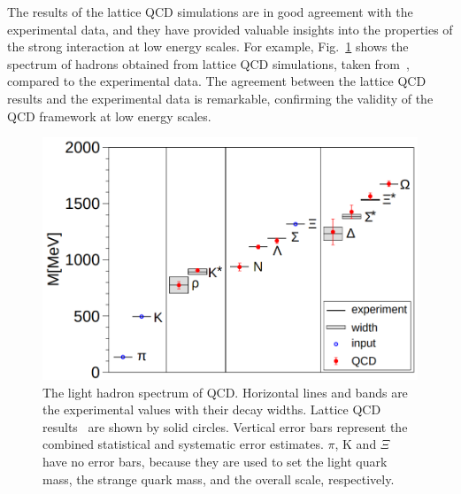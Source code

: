 The results of the lattice QCD simulations are in good agreement with the experimental data, and they have provided valuable insights into the properties of the strong interaction at low energy scales. For example, Fig.~\ref{fig:LQCD_hadron_mass} shows the spectrum of hadrons obtained from lattice QCD simulations, taken from~\cite{BMW:2008jgk}, compared to the experimental data. The agreement between the lattice QCD results and the experimental data is remarkable, confirming the validity of the QCD framework at low energy scales.
\begin{figure}[t!]
  \centering
  \includegraphics[width=0.7\linewidth]{Figures/Chapter 1/LQCD_hadron_mass.png}
  \caption{The light hadron spectrum of QCD. Horizontal lines and bands are the experimental values with their decay widths. Lattice QCD results~\cite{BMW:2008jgk} are shown by solid circles. Vertical error bars represent the combined statistical and systematic error estimates. $\pi$, K and $\Xi$ have no error bars, because they are used to set the light quark mass, the strange quark mass, and the overall scale, respectively.}
  \label{fig:LQCD_hadron_mass}
\end{figure}

